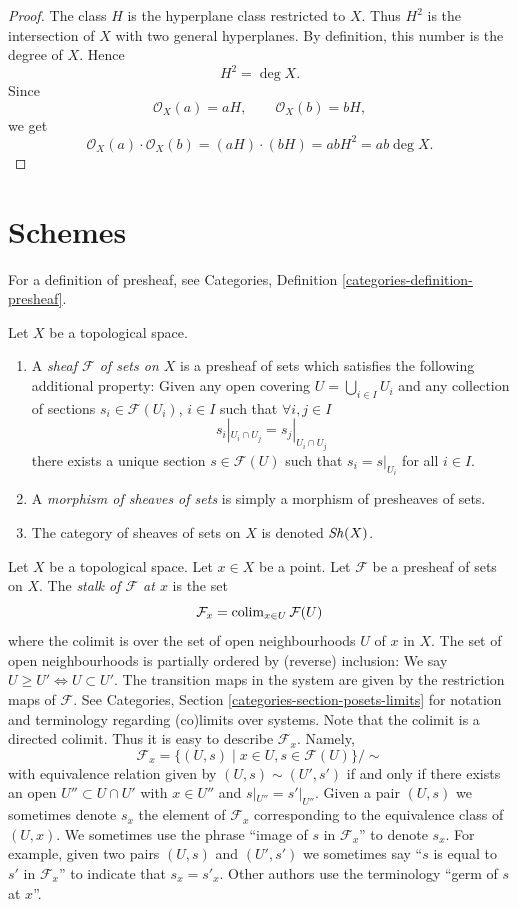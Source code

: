 \begin{proof}
The class $H$ is the hyperplane class
restricted to $X$. Thus $H^2$ is the
intersection of $X$ with two general
hyperplanes. By definition, this number
is the degree of $X$. Hence
$$
  H^2=\deg X.
$$
Since
$$
  \mathcal O_X(a)=aH,
  \qquad
  \mathcal O_X(b)=bH,
$$
we get
$$
  \mathcal O_X(a)\cdot\mathcal O_X(b)
  =
  (aH)\cdot(bH)
  =
  abH^2
  =
  ab\deg X.
$$
\end{proof}

\section{Schemes}
\label{section-shemes}

For a definition of presheaf,
see Categories, Definition
\ref{categories-definition-presheaf}.

\begin{definition}
\label{definition-sheaf}
Let $X$ be a topological space.
\begin{enumerate}
\item A {\it sheaf $\mathcal{F}$ of sets on
$X$} is a presheaf
of sets which satisfies the following
additional property: Given
any open covering $U = \bigcup_{i \in I} U_i$
and any collection
of sections $s_i \in \mathcal{F}(U_i)$, $i
\in I$ such that
$\forall i, j\in I$
$$
s_i|_{U_i \cap U_j} = s_j|_{U_i \cap U_j}
$$
there exists a unique section $s \in
\mathcal{F}(U)$ such that
$s_i = s|_{U_i}$ for all $i \in I$.
\item A {\it morphism of sheaves of sets} is
simply a
morphism of presheaves of sets.
\item The category of sheaves of sets on $X$
is denoted
$\mathop{\mathit{Sh}}\nolimits(X)$.
\end{enumerate}
\end{definition}


\medskip\noindent
Let $X$ be a topological space. Let $x \in X$
be a point.
Let $\mathcal{F}$ be a presheaf of sets on
$X$.
The {\it stalk of $\mathcal{F}$ at $x$} is
the set
$$
\mathcal{F}_x
=
\mathop{\mathrm{colim}}\nolimits_{x\in U} \mathcal{F}(U)
$$
where the colimit is over the set of open
neighbourhoods
$U$ of $x$ in $X$. The set of open
neighbourhoods is
partially ordered by (reverse) inclusion:
We say $U \geq U' \Leftrightarrow U \subset
U'$.
The transition maps in the system are
given by the restriction maps of
$\mathcal{F}$.
See Categories, Section
\ref{categories-section-posets-limits}
for notation and terminology regarding
(co)limits over systems.
Note that the colimit is a directed colimit.
Thus it is easy to describe $\mathcal{F}_x$.
Namely,
$$
\mathcal{F}_x
=
\{
(U, s)
\mid
x\in U, s\in \mathcal{F}(U)
\}/\sim
$$
with equivalence relation given by $(U, s)
\sim (U', s')$ if and only if
there exists an open $U'' \subset U \cap U'$
with $x \in U''$ and
$s|_{U''} = s'|_{U''}$. Given a pair $(U, s)$
we sometimes denote
$s_x$ the element of $\mathcal{F}_x$
corresponding to the equivalence
class of $(U, x)$. We sometimes use the
phrase
``image of $s$ in $\mathcal{F}_x$'' to denote
$s_x$.
For example, given two pairs $(U, s)$ and
$(U', s')$ we sometimes
say ``$s$ is equal to $s'$ in
$\mathcal{F}_x$'' to indicate
that $s_x = s'_x$. Other authors use the
terminology
``germ of $s$ at $x$''.

